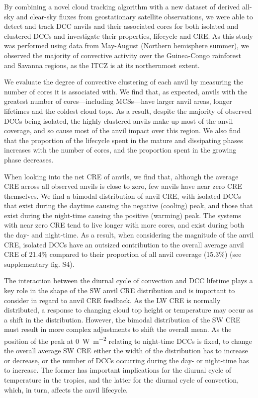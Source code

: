 \documentclass[acp, manuscript]{copernicus}
\begin{document}
\conclusions  %

By combining a novel cloud tracking algorithm with a new dataset of derived all-sky and clear-sky fluxes from geostationary satellite observations, we were able to detect and track DCC anvils and their associated cores for both isolated and clustered DCCs and investigate their properties, lifecycle and CRE. 
As this study was performed using data from May-August (Northern hemisphere summer), we observed the majority of convective activity over the Guinea-Congo rainforest and Savanna regions, as the ITCZ is at its northernmost extent.

We evaluate the degree of convective clustering of each anvil by measuring the number of cores it is associated with. 
We find that, as expected, anvils with the greatest number of cores---including MCSs---have larger anvil areas, longer lifetimes and the coldest cloud tops. 
As a result, despite the majority of observed DCCs being isolated, the highly clustered anvils make up most of the anvil coverage, and so cause most of the anvil impact over this region. 
We also find that the proportion of the lifecycle spent in the mature and dissipating phases increases with the number of cores, and the proportion spent in the growing phase decreases.

When looking into the net CRE of anvils, we find that, although the average CRE across all observed anvils is close to zero, few anvils have near zero CRE themselves. 
We find a bimodal distribution of anvil CRE, with isolated DCCs that exist during the daytime causing the negative (cooling) peak, and those that exist during the night-time causing the positive (warming) peak. 
The systems with near zero CRE tend to live longer with more cores, and exist during both the day- and night-time. 
As a result, when considering the magnitude of the anvil CRE, isolated DCCs have an outsized contribution to the overall average anvil CRE of 21.4\% compared to their proportion of all anvil coverage (15.3\%) (see supplementary fig. S4).

The interaction between the diurnal cycle of convection and DCC lifetime plays a key role in the shape of the SW anvil CRE distribution and is important to consider in regard to anvil CRE feedback. 
As the LW CRE is normally distributed, a response to changing cloud top height or temperature may occur as a shift in the distribution. 
However, the bimodal distribution of the SW CRE must result in more complex adjustments to shift the overall mean. 
As the position of the peak at 0 \,\unit{W m^{-2}} relating to night-time DCCs is fixed, to change the overall average SW CRE either the width of the distribution has to increase or decrease, or the number of DCCs occurring during the day- or night-time has to increase. 
The former has important implications for the diurnal cycle of temperature in the tropics, and the latter for the diurnal cycle of convection, which, in turn, affects the anvil lifecycle.
\end{document}
